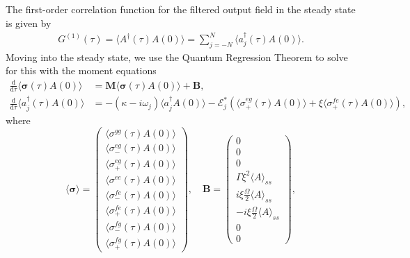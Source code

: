 \documentclass{article}
\newcommand{\ddtau}[1][]{\frac{\mathrm{d} #1}{\mathrm{d}\tau}}
\begin{document}
The first-order correlation function for the filtered output field in the steady state is given by
\begin{align}
	G^{(1)}(\tau) = \langle A^{\dagger}(\tau) A(0) \rangle = \sum_{j=-N}^{N} \langle a^{\dagger}_{j} (\tau) A(0) \rangle.
\end{align}
Moving into the steady state, we use the Quantum Regression Theorem to solve for this with the moment equations
\begin{subequations}
	\begin{align}
		\ddtau \langle \bm{\sigma}(\tau) A(0) \rangle &= \bm{M} \langle \bm{\sigma}(\tau) A(0) \rangle + \bm{B}, \\
		\ddtau \langle a^{\dagger}_{j}(\tau) A(0) \rangle &= -\left( \kappa - i \omega_{j} \right) \langle a^{\dagger}_{j} A(0) \rangle - \mathcal{E}_{j}^{*} \left( \langle \sigma^{eg}_{+}(\tau) A(0) \rangle + \xi \langle \sigma^{fe}_{+}(\tau) A(0) \rangle \right),
	\end{align}
\end{subequations}
where
\begin{equation}
	\langle \bm{\sigma} \rangle =
	\begin{pmatrix}
		\langle \sigma^{gg}(\tau) A(0) \rangle \\
		\langle \sigma^{eg}_{-}(\tau) A(0) \rangle \\
		\langle \sigma^{eg}_{+}(\tau) A(0) \rangle \\
		\langle \sigma^{ee}(\tau) A(0) \rangle \\
		\langle \sigma^{fe}_{-}(\tau) A(0) \rangle \\
		\langle \sigma^{fe}_{+}(\tau) A(0) \rangle \\
		\langle \sigma^{fg}_{-}(\tau) A(0) \rangle \\
		\langle \sigma^{fg}_{+}(\tau) A(0) \rangle
	\end{pmatrix}, \quad \bm{B} =
	\begin{pmatrix}
		0 \\
		0 \\
		0 \\
		\Gamma \xi^{2} \langle A \rangle_{ss} \\
		i \xi \frac{\Omega}{2} \langle A \rangle_{ss} \\
		-i \xi \frac{\Omega}{2} \langle A \rangle_{ss} \\
		0 \\
		0
	\end{pmatrix},
\end{equation}
\end{document}
